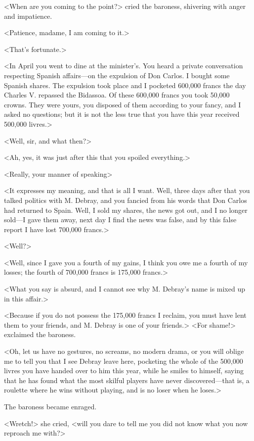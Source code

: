  <When are you coming to the point?> cried the baroness, shivering with anger and impatience. 

 <Patience, madame, I am coming to it.> 

 <That's fortunate.> 

 <In April you went to dine at the minister's. You heard a private conversation respecting Spanish affairs—on the expulsion of Don Carlos. I bought some Spanish shares. The expulsion took place and I pocketed 600,000 francs the day Charles V. repassed the Bidassoa. Of these 600,000 francs you took 50,000 crowns. They were yours, you disposed of them according to your fancy, and I asked no questions; but it is not the less true that you have this year received 500,000 livres.> 

 <Well, sir, and what then?> 

 <Ah, yes, it was just after this that you spoiled everything.> 

 <Really, your manner of speaking\longdash> 

 <It expresses my meaning, and that is all I want. Well, three days after that you talked politics with M. Debray, and you fancied from his words that Don Carlos had returned to Spain. Well, I sold my shares, the news got out, and I no longer sold—I gave them away, next day I find the news was false, and by this false report I have lost 700,000 francs.> 

 <Well?> 

 <Well, since I gave you a fourth of my gains, I think you owe me a fourth of my losses; the fourth of 700,000 francs is 175,000 francs.> 

 <What you say is absurd, and I cannot see why M. Debray's name is mixed up in this affair.> 

 <Because if you do not possess the 175,000 francs I reclaim, you must have lent them to your friends, and M. Debray is one of your friends.>  <For shame!> exclaimed the baroness. 

 <Oh, let us have no gestures, no screams, no modern drama, or you will oblige me to tell you that I see Debray leave here, pocketing the whole of the 500,000 livres you have handed over to him this year, while he smiles to himself, saying that he has found what the most skilful players have never discovered—that is, a roulette where he wins without playing, and is no loser when he loses.> 

 The baroness became enraged. 

 <Wretch!> she cried, <will you dare to tell me you did not know what you now reproach me with?> 

